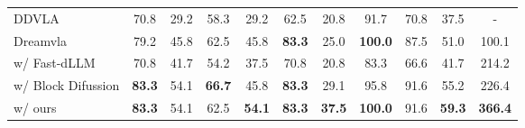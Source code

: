 \begin{table}[t]
{\begin{tabular}{lcccccccccc}
DDVLA~\citep{liang2025discrete} 
& 70.8 & 29.2 
& 58.3 & 29.2 
& 62.5 & 20.8 
& 91.7 & 70.8 
& 37.5 & - \\

Dreamvla~\citep{yedreamVLA} 
& 79.2 & 45.8 
& 62.5 & 45.8 
& \textbf{83.3} & 25.0 
& \textbf{100.0} & 87.5 
& 51.0 & 100.1 \\

\hspace{3mm} w/ Fast-dLLM 
& 70.8 & 41.7 
& 54.2 & 37.5 
& 70.8 & 20.8 
& 83.3 & 66.6 
& 41.7 & 214.2 \\

\hspace{3mm} w/ Block Difussion 
& \textbf{83.3} & 54.1 
& \textbf{66.7} & 45.8 
& \textbf{83.3} & 29.1 
& 95.8 & 91.6 
& 55.2 & 226.4 \\

\rowcolor[gray]{0.9} \hspace{3mm} w/ ours 
& \textbf{83.3} & 54.1 
& 62.5 & \textbf{54.1} 
& \textbf{83.3} & \textbf{37.5} 
& \textbf{100.0} & 91.6 
& \textbf{59.3} & \textbf{366.4} \\

\bottomrule
\end{tabular}%
}
\end{table}